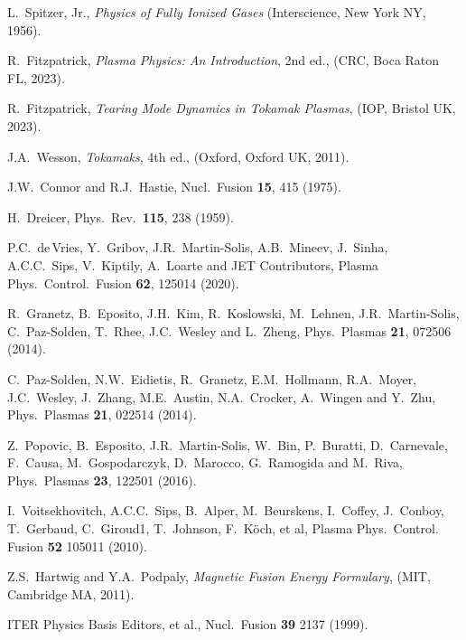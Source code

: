 \documentclass[12pt,prb,aps]{revtex4-1}
\begin{document}
\begin{thebibliography}{99}
 L.~Spitzer, Jr., {\em Physics of Fully Ionized Gases}\/ (Interscience, New York NY, 1956).

 R.~Fitzpatrick, {\em Plasma Physics: An Introduction}, 2nd ed., (CRC, Boca Raton FL, 2023).

 R.~Fitzpatrick, {\em Tearing Mode Dynamics in Tokamak Plasmas}, (IOP, Bristol UK, 2023).

 J.A.~Wesson, {\em Tokamaks}, 4th ed., (Oxford, Oxford UK, 2011).

 J.W.~Connor and R.J.~Hastie, Nucl.\ Fusion {\bf 15}, 415 (1975).

 H.~Dreicer, Phys.\ Rev.\ {\bf 115}, 238 (1959).

 P.C.~de\,Vries, Y.~Gribov, J.R.~Martin-Solis, A.B.~Mineev, J.~Sinha, A.C.C.~Sips, V.~Kiptily, A.~Loarte and JET Contributors, Plasma Phys.\ Control.\ Fusion
{\bf 62}, 125014 (2020). 

 R.~Granetz, B.~Eposito, J.H.~Kim, R.~Koslowski, M.~Lehnen, J.R.~Martin-Solis, C.~Paz-Solden, T.~Rhee, J.C.~Wesley
and L.~Zheng, Phys.\ Plasmas {\bf 21}, 072506 (2014).

 C.~Paz-Solden,  N.W.~Eidietis,  R.~Granetz, E.M.~Hollmann, R.A.~Moyer, J.C.~Wesley, J.~Zhang, M.E.~Austin, N.A.~Crocker, A.~Wingen and Y.~Zhu, 
 Phys.\ Plasmas {\bf 21}, 022514 (2014).

 Z.~Popovic, B.~Esposito, J.R.~Martin-Solis, W.~Bin,  P.~Buratti, D.~Carnevale, F.~Causa, M.~Gospodarczyk,
D.~Marocco, G.~Ramogida and M.~Riva, Phys.\ Plasmas {\bf 23}, 122501 (2016). 

 I.~Voitsekhovitch, A.C.C.~Sips, B.~Alper, M.~Beurskens, I.~Coffey,
J.~Conboy, T.~Gerbaud, C.~Giroud1, T.~Johnson, F.~K\"{o}ch, et al, Plasma Phys.\ Control. Fusion {\bf 52}  105011 (2010). 

 Z.S.~Hartwig and Y.A.~Podpaly, {\em Magnetic Fusion Energy Formulary}, (MIT, Cambridge MA, 2011).
 
 ITER Physics Basis Editors, et al., Nucl.\ Fusion {\bf 39} 2137 (1999). 
 
\end{thebibliography}
\end{document}
